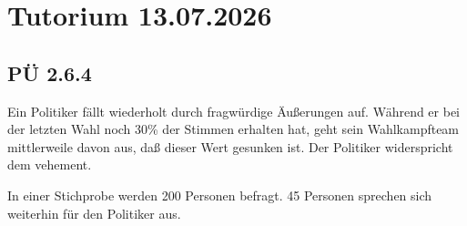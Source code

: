 
\section{Tutorium 13.07.2026 \abhaken}\label{ch:tutorium-13.07.2026}


\subsection{PÜ 2.6.4 \abhaken}\label{sec:pu-2.6.4}
Ein Politiker fällt wiederholt durch fragwürdige Äußerungen auf.
Während er bei der letzten
Wahl noch 30\% der Stimmen erhalten hat, geht sein Wahlkampfteam mittlerweile davon aus,
daß dieser Wert gesunken ist.
Der Politiker widerspricht dem vehement.

In einer Stichprobe werden 200 Personen befragt.
45 Personen sprechen sich weiterhin für den
Politiker aus.

